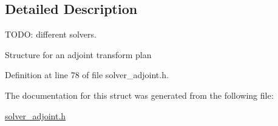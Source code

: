 \subsection{Detailed Description}
TODO: different solvers. 

Structure for an adjoint transform plan 

Definition at line 78 of file solver\_\-adjoint.h.

The documentation for this struct was generated from the following file:\begin{CompactItemize}
\item 
\hyperlink{solver__adjoint_8h}{solver\_\-adjoint.h}\end{CompactItemize}
